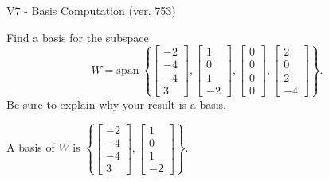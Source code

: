 \begin{exercise}
  \begin{exerciseTitle}V7 - Basis Computation (ver. 753)\end{exerciseTitle}
  \begin{exerciseStatement}
    Find a basis for the subspace 
\[W=\mathrm{span}\ \left\{\left[\begin{array}{r}
-2 \\
-4 \\
-4 \\
3
\end{array}\right] , \left[\begin{array}{r}
1 \\
0 \\
1 \\
-2
\end{array}\right] , \left[\begin{array}{r}
0 \\
0 \\
0 \\
0
\end{array}\right] , \left[\begin{array}{r}
2 \\
0 \\
2 \\
-4
\end{array}\right]\right\}.\]
 Be sure to explain why your result is a basis.


  \end{exerciseStatement}
  \begin{exerciseAnswer}
   A basis of \(W\) is  \(\left\{\left[\begin{array}{r}
-2 \\
-4 \\
-4 \\
3
\end{array}\right] , \left[\begin{array}{r}
1 \\
0 \\
1 \\
-2
\end{array}\right]\right\}\).
  


  \end{exerciseAnswer}
\end{exercise}